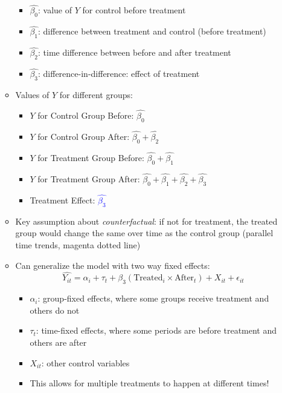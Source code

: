 \documentclass{article}
\begin{document}
\begin{itemize}
\begin{itemize}
		\begin{itemize}
			\item $\hat{\beta_0}$: value of $Y$ for control before treatment 
			\item $\hat{\beta_1}$: difference between treatment and control (before treatment)
			\item $\hat{\beta_2}$: time difference between before and after treatment
			\item $\hat{\beta_3}$: difference-in-difference: effect of treatment    
		\end{itemize}
	\item Values of $Y$ for different groups:
		\begin{itemize}
			\item $Y$ for Control Group Before: $\hat{\beta_0}$
			\item $Y$ for Control Group After: $\hat{\beta_0}+\hat{\beta_2}$
			\item $Y$ for Treatment Group Before: $\hat{\beta_0}+\hat{\beta_1}$
			\item $Y$ for Treatment Group After: $\hat{\beta_0}+\hat{\beta_1}+\hat{\beta_2}+\hat{\beta_3}$
			\item Treatment Effect: \textcolor{blue}{$\hat{\beta_3}$}
		\end{itemize}
	\item Key assumption about \emph{counterfactual}: if not for treatment, the treated group would change the same over time as the control group (parallel time trends, magenta dotted line)
	\item Can generalize the model with  two way fixed effects: 
	\begin{equation*}
\widehat{Y_{it}}=\alpha_i +\tau_t+\beta_3 (\text{Treated}_i \times \text{After}_{t})+ X_{it}+\epsilon_{it}	
\end{equation*}
	\begin{itemize}
		\item $\alpha_i$: group-fixed effects, where some groups receive treatment and others do not
		\item $\tau_t$: time-fixed effects, where some periods are before treatment and others are after
		\item $X_{it}$: other control variables 
		\item This allows for multiple treatments to happen at different times! 
	\end{itemize}
\end{itemize}
\end{itemize}
\clearpage 
\end{document}

